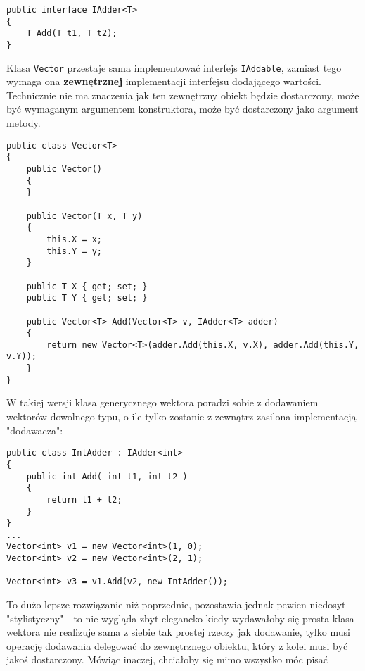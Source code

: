 \begin{scriptsize}
\begin{verbatim}
public interface IAdder<T>
{
    T Add(T t1, T t2);
}
\end{verbatim}
\end{scriptsize}

Klasa {\tt Vector} przestaje sama implementować interfejs {\tt IAddable}, zamiast tego wymaga ona {\bf zewnętrznej}
implementacji interfejsu dodającego wartości. Technicznie nie ma znaczenia jak ten zewnętrzny obiekt będzie
dostarczony, może być wymaganym argumentem konstruktora, może być dostarczony jako argument metody. 

\begin{scriptsize}
\begin{verbatim}
public class Vector<T>
{
    public Vector()
    {
    }

    public Vector(T x, T y)
    {
        this.X = x;
        this.Y = y;
    }

    public T X { get; set; }
    public T Y { get; set; }

    public Vector<T> Add(Vector<T> v, IAdder<T> adder)
    {
        return new Vector<T>(adder.Add(this.X, v.X), adder.Add(this.Y, v.Y));
    }
}
\end{verbatim}
\end{scriptsize}

W takiej wersji klasa generycznego wektora poradzi sobie z dodawaniem wektorów dowolnego typu, o ile tylko
zostanie z zewnątrz zasilona implementacją "dodawacza":

\begin{scriptsize}
\begin{verbatim}
public class IntAdder : IAdder<int>
{
    public int Add( int t1, int t2 )
    {
        return t1 + t2;
    }
}
...
Vector<int> v1 = new Vector<int>(1, 0);
Vector<int> v2 = new Vector<int>(2, 1);

Vector<int> v3 = v1.Add(v2, new IntAdder());
\end{verbatim}
\end{scriptsize}

To dużo lepsze rozwiązanie niż poprzednie, pozostawia jednak pewien niedosyt "stylistyczny" - to nie wygląda zbyt
elegancko kiedy wydawałoby się prosta klasa wektora nie realizuje sama z siebie tak prostej rzeczy jak dodawanie, tylko
musi operację dodawania delegować do zewnętrznego obiektu, który z kolei musi być jakoś dostarczony. Mówiąc inaczej,
chciałoby się mimo wszystko móc pisać

